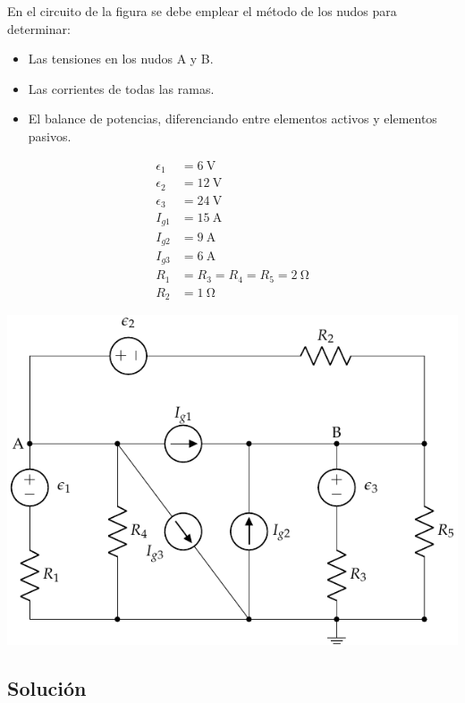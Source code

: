\documentclass[10pt]{article}
\begin{document}
En el circuito de la figura se debe emplear el método de los nudos para determinar:
\begin{itemize}
\item Las tensiones en los nudos A y B.
\item Las corrientes de todas las ramas.
\item El balance de potencias, diferenciando entre elementos activos y elementos pasivos.
\end{itemize}

\begin{minipage}[c]{0.3\linewidth}
  \begin{align*}
    \epsilon_1&=\SI{6}{\volt}\\
    \epsilon_2&=\SI{12}{\volt}\\
    \epsilon_3&=\SI{24}{\volt}\\
    I_{g1} &= \SI{15}{\ampere}\\
    I_{g2} &= \SI{9}{\ampere}\\
    I_{g3} &= \SI{6}{\ampere}\\
    R_{1}&= R_3 = R_4 = R_5 = \SI{2}{\ohm}\\
    R_{2}&= \SI{1}{\ohm}
  \end{align*}
\end{minipage}
\begin{minipage}[c]{0.7\linewidth}
  \includegraphics{figs/nudos_fuentes.pdf}
\end{minipage}

\subsection*{Solución}
\end{document}
